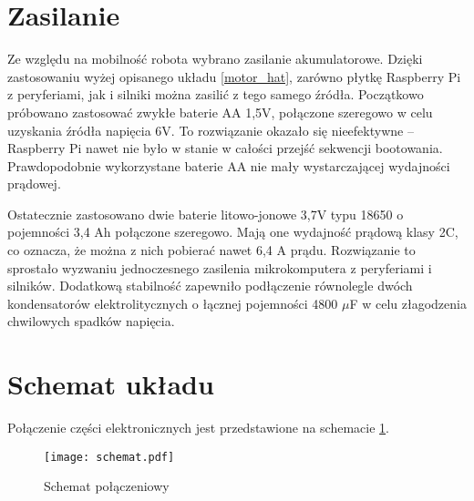 \section{Zasilanie}
Ze względu na mobilność robota wybrano zasilanie akumulatorowe.
Dzięki zastosowaniu wyżej opisanego układu \ref{motor_hat}, zarówno płytkę Raspberry Pi z peryferiami, jak i silniki można zasilić z tego samego źródła.
Początkowo próbowano zastosować zwykłe baterie AA 1,5V, połączone szeregowo w celu uzyskania źródła napięcia 6V.
To rozwiązanie okazało się nieefektywne -- Raspberry Pi nawet nie było w stanie w całości przejść sekwencji bootowania.
Prawdopodobnie wykorzystane baterie AA nie mały wystarczającej wydajności prądowej.

Ostatecznie zastosowano dwie baterie litowo-jonowe 3,7V typu 18650 o pojemności 3,4 Ah połączone szeregowo.
Mają one wydajność prądową klasy 2C, co oznacza, że można z nich pobierać nawet 6,4 A prądu.
Rozwiązanie to sprostało wyzwaniu jednoczesnego zasilenia mikrokomputera z peryferiami i silników.
Dodatkową stabilność zapewniło podłączenie równolegle dwóch kondensatorów elektrolitycznych o łącznej pojemności 4800 $\mu$F w celu złagodzenia chwilowych spadków napięcia.

\section{Schemat układu}
Połączenie części elektronicznych jest przedstawione na schemacie \ref{rys:schemat}.
\begin{figure}[!hb]
    \centering \texttt{[image: schemat.pdf]}
    \caption{Schemat połączeniowy}
    \label{rys:schemat}
\end{figure}

